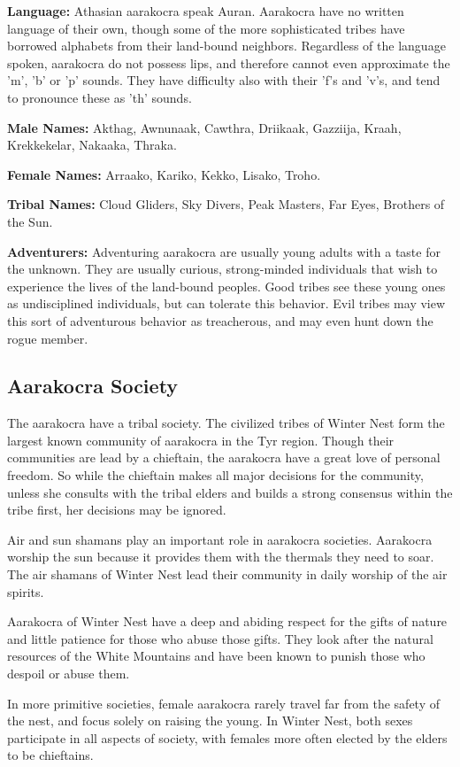 \textbf{Language:} Athasian aarakocra speak Auran. Aarakocra have no written language of their own, though some of the more sophisticated tribes have borrowed alphabets from their land-bound neighbors. Regardless of the language spoken, aarakocra do not possess lips, and therefore cannot even approximate the 'm', 'b' or 'p' sounds. They have difficulty also with their 'f's and 'v's, and tend to pronounce these as 'th' sounds.

\textbf{Male Names:} Akthag, Awnunaak, Cawthra, Driikaak, Gazziija, Kraah, Krekkekelar, Nakaaka, Thraka.

\textbf{Female Names:} Arraako, Kariko, Kekko, Lisako, Troho.

\textbf{Tribal Names:} Cloud Gliders, Sky Divers, Peak Masters, Far Eyes, Brothers of the Sun.

\textbf{Adventurers:} Adventuring aarakocra are usually young adults with a taste for the unknown. They are usually curious, strong-minded individuals that wish to experience the lives of the land-bound peoples. Good tribes see these young ones as undisciplined individuals, but can tolerate this behavior. Evil tribes may view this sort of adventurous behavior as treacherous, and may even hunt down the rogue member.

\subsection{Aarakocra Society}
The aarakocra have a tribal society. The civilized tribes of Winter Nest form the largest known community of aarakocra in the Tyr region. Though their communities are lead by a chieftain, the aarakocra have a great love of personal freedom. So while the chieftain makes all major decisions for the community, unless she consults with the tribal elders and builds a strong consensus within the tribe first, her decisions may be ignored.

Air and sun shamans play an important role in aarakocra societies. Aarakocra worship the sun because it provides them with the thermals they need to soar. The air shamans of Winter Nest lead their community in daily worship of the air spirits.

Aarakocra of Winter Nest have a deep and abiding respect for the gifts of nature and little patience for those who abuse those gifts. They look after the natural resources of the White Mountains and have been known to punish those who despoil or abuse them.

In more primitive societies, female aarakocra rarely travel far from the safety of the nest, and focus solely on raising the young. In Winter Nest, both sexes participate in all aspects of society, with females more often elected by the elders to be chieftains.

